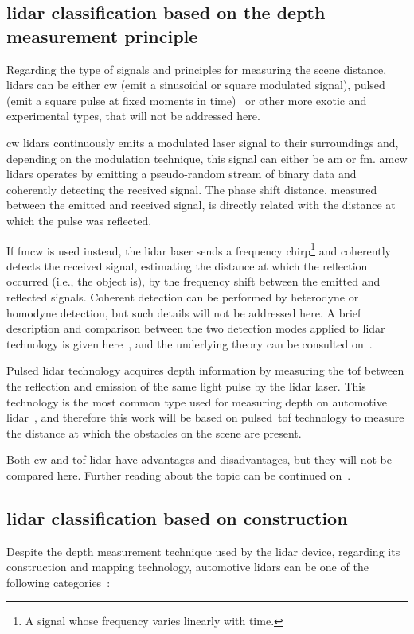 \subsection{\ac{lidar} classification based on the depth measurement principle}
Regarding the type of signals and principles for measuring the scene distance, \acp{lidar} can be either \ac{cw} (emit a sinusoidal or square modulated signal), pulsed (emit a square pulse at fixed moments in time)~\cite{Payne2009, TexasLiDAR, SpringerOptics} or other more exotic and experimental types, that will not be addressed here.

\ac{cw} \acp{lidar} continuously emits a modulated laser signal to their surroundings and, depending on the modulation technique, this signal can either be \ac{am} or \ac{fm}\cite{TexasLiDAR}. \ac{am}\ac{cw} \acp{lidar} operates by emitting a pseudo-random stream of binary data and coherently detecting the received signal. The phase shift distance, measured between the emitted and received signal, is directly related with the distance at which the pulse was reflected.

If \ac{fm}\ac{cw} is used instead, the \ac{lidar} \ac{laser} sends a frequency chirp\footnote{A signal whose frequency varies linearly with time.} and coherently detects the received signal, estimating the distance at which the reflection occurred (i.e., the object is), by the frequency shift between the emitted and reflected signals\cite{Payne2009, TexasLiDAR}. Coherent detection can be performed by heterodyne or homodyne detection, but such details will not be addressed here. A brief description and comparison between the two detection modes applied to \ac{lidar} technology is given here~\cite{Conroy2009}, and the underlying theory can be consulted on~\cite{Carlson2010, SpringerOptics}.

Pulsed \ac{lidar} technology acquires depth information by measuring the \acf{tof} between the reflection and emission of the same light pulse by the \ac{lidar} \ac{laser}. This technology is the most common type used for measuring depth on automotive \ac{lidar}~\cite{Sullivan2016}, and therefore this work will be based on pulsed~\ac{tof} technology to measure the distance at which the obstacles on the scene are present.

Both \ac{cw} and \ac{tof} \ac{lidar} have advantages and disadvantages, but they will not be compared here. Further reading about the topic can be continued on~\cite{Sullivan2016, Simonite2017, Payne2009, TexasLiDAR}.


\subsection{\ac{lidar} classification based on construction}
Despite the depth measurement technique used by the \ac{lidar} device, regarding its construction and mapping technology, automotive \acp{lidar} can be one of the following categories~\cite{Hecht2018, Sullivan2016}:

